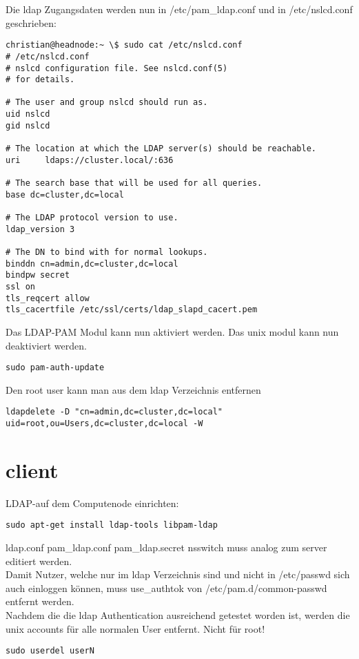 Die ldap Zugangsdaten werden nun in /etc/pam\_ldap.conf und in /etc/nslcd.conf geschrieben:
\begin{lstlisting}[style=Bash]
christian@headnode:~ \$ sudo cat /etc/nslcd.conf 
# /etc/nslcd.conf
# nslcd configuration file. See nslcd.conf(5)
# for details.

# The user and group nslcd should run as.
uid nslcd
gid nslcd

# The location at which the LDAP server(s) should be reachable.
uri     ldaps://cluster.local/:636

# The search base that will be used for all queries.
base dc=cluster,dc=local

# The LDAP protocol version to use.
ldap_version 3

# The DN to bind with for normal lookups.
binddn cn=admin,dc=cluster,dc=local
bindpw secret
ssl on
tls_reqcert allow
tls_cacertfile /etc/ssl/certs/ldap_slapd_cacert.pem
\end{lstlisting}

Das LDAP-PAM Modul kann nun aktiviert werden. Das unix modul kann nun deaktiviert werden.
\begin{lstlisting}[style=Bash]
sudo pam-auth-update
\end{lstlisting}
Den root user kann man aus dem ldap Verzeichnis entfernen
\begin{lstlisting}[style=Bash]
ldapdelete -D "cn=admin,dc=cluster,dc=local" uid=root,ou=Users,dc=cluster,dc=local -W
\end{lstlisting}
\section{client}
LDAP-auf dem Computenode einrichten:
\begin{lstlisting}[style=Bash]
sudo apt-get install ldap-tools libpam-ldap
\end{lstlisting}
{ldap.conf pam\_ldap.conf pam\_ldap.secret nsswitch} muss analog zum server editiert werden.\\
Damit Nutzer, welche nur im ldap Verzeichnis sind und nicht in /etc/passwd sich auch einloggen können, muss use\_authtok von /etc/pam.d/common-passwd entfernt werden.\\
Nachdem die die ldap Authentication ausreichend getestet worden ist, werden die unix accounts für alle normalen User entfernt. Nicht für root!\\
\begin{lstlisting}[style=Bash]
sudo userdel userN
\end{lstlisting}
